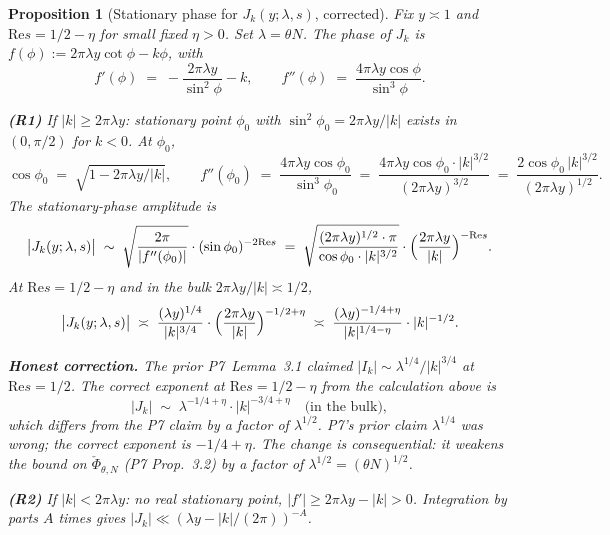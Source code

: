 \documentclass[11pt]{article}
\newtheorem{proposition}[theorem]{Proposition}
\theoremstyle{definition}
\renewcommand{\Re}{\mathrm{Re}}
\begin{document}
\begin{proposition}[Stationary phase for $J_k(y;\lambda,s)$, corrected]\label{prop:stat-phase-fixed}
Fix $y\asymp 1$ and $\Re s=1/2-\eta$ for small fixed $\eta>0$. Set $\lambda=\theta N$. The phase of $J_k$ is $f(\phi):=2\pi\lambda y\cot\phi-k\phi$, with
\[
f'(\phi)\;=\;-\frac{2\pi\lambda y}{\sin^2\phi}-k,\qquad f''(\phi)\;=\;\frac{4\pi\lambda y\cos\phi}{\sin^3\phi}.
\]

\textbf{(R1)} If $|k|\ge 2\pi\lambda y$: stationary point $\phi_0$ with $\sin^2\phi_0=2\pi\lambda y/|k|$ exists in $(0,\pi/2)$ for $k<0$. At $\phi_0$,
\[
\cos\phi_0\;=\;\sqrt{1-2\pi\lambda y/|k|},\qquad f''(\phi_0)\;=\;\frac{4\pi\lambda y\cos\phi_0}{\sin^3\phi_0}\;=\;\frac{4\pi\lambda y\cos\phi_0\cdot|k|^{3/2}}{(2\pi\lambda y)^{3/2}}\;=\;\frac{2\cos\phi_0\,|k|^{3/2}}{(2\pi\lambda y)^{1/2}}.
\]
The stationary-phase amplitude is
\[
\bigl|J_k(y;\lambda,s)\bigr|\;\sim\;\sqrt{\frac{2\pi}{|f''(\phi_0)|}}\cdot(\sin\phi_0)^{-2\Re s}\;=\;\sqrt{\frac{(2\pi\lambda y)^{1/2}\cdot\pi}{\cos\phi_0\cdot|k|^{3/2}}}\cdot\Bigl(\frac{2\pi\lambda y}{|k|}\Bigr)^{-\Re s}.
\]
At $\Re s=1/2-\eta$ and in the bulk $2\pi\lambda y/|k|\asymp 1/2$,
\begin{equation}\label{eq:Jk-bulk}
\bigl|J_k(y;\lambda,s)\bigr|\;\asymp\;\frac{(\lambda y)^{1/4}}{|k|^{3/4}}\cdot\Bigl(\frac{2\pi\lambda y}{|k|}\Bigr)^{-1/2+\eta}\;\asymp\;\frac{(\lambda y)^{-1/4+\eta}}{|k|^{1/4-\eta}}\cdot|k|^{-1/2}.
\end{equation}

\textbf{Honest correction.} The prior P7~Lemma~3.1 claimed $|I_k|\sim\lambda^{1/4}/|k|^{3/4}$ at $\Re s=1/2$. The correct exponent at $\Re s=1/2-\eta$ from the calculation above is
\[
|J_k|\;\sim\;\lambda^{-1/4+\eta}\cdot|k|^{-3/4+\eta}\quad\text{(in the bulk)},
\]
which differs from the P7 claim by a factor of $\lambda^{1/2}$. P7's prior claim $\lambda^{1/4}$ was \emph{wrong}; the correct exponent is $-1/4+\eta$. The change is consequential: it weakens the bound on $\check\Phi_{\theta,N}$ (P7 Prop.\ 3.2) by a factor of $\lambda^{1/2}=(\theta N)^{1/2}$.

\textbf{(R2)} If $|k|<2\pi\lambda y$: no real stationary point, $|f'|\ge 2\pi\lambda y-|k|>0$. Integration by parts $A$ times gives $|J_k|\ll(\lambda y-|k|/(2\pi))^{-A}$.
\end{proposition}
\end{document}
